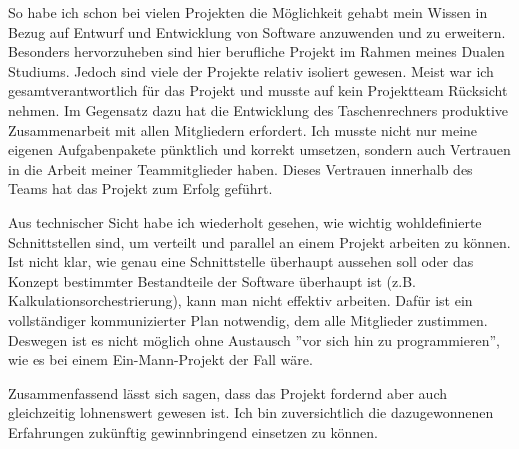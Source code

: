 So habe ich schon bei vielen Projekten die Möglichkeit gehabt mein Wissen in Bezug auf Entwurf und Entwicklung von Software anzuwenden und zu erweitern. Besonders hervorzuheben sind hier berufliche Projekt im Rahmen meines Dualen Studiums. Jedoch sind viele der Projekte relativ isoliert gewesen. Meist war ich gesamtverantwortlich für das Projekt und musste auf kein Projektteam Rücksicht nehmen. Im Gegensatz dazu hat die Entwicklung des Taschenrechners produktive Zusammenarbeit mit allen Mitgliedern erfordert. Ich musste nicht nur meine eigenen Aufgabenpakete pünktlich und korrekt umsetzen, sondern auch Vertrauen in die Arbeit meiner Teammitglieder haben. Dieses Vertrauen innerhalb des Teams hat das Projekt zum Erfolg geführt.

Aus technischer Sicht habe ich wiederholt gesehen, wie wichtig wohldefinierte Schnittstellen sind, um verteilt und parallel an einem Projekt arbeiten zu können. Ist nicht klar, wie genau eine Schnittstelle überhaupt aussehen soll oder das Konzept bestimmter Bestandteile der Software überhaupt ist (z.B. Kalkulationsorchestrierung), kann man nicht effektiv arbeiten. Dafür ist ein vollständiger kommunizierter Plan notwendig, dem alle Mitglieder zustimmen. Deswegen ist es nicht möglich ohne Austausch ''vor sich hin zu programmieren'', wie es bei einem Ein-Mann-Projekt der Fall wäre.

Zusammenfassend lässt sich sagen, dass das Projekt fordernd aber auch gleichzeitig lohnenswert gewesen ist. Ich bin zuversichtlich die dazugewonnenen Erfahrungen zukünftig gewinnbringend einsetzen zu können.
